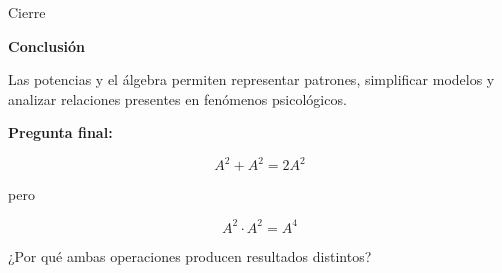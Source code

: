 \documentclass[handout,aspectratio=169]{beamer}
\begin{document}
	
	\begin{frame}{Cierre}
		\begin{center}
			{\Huge \textbf{Conclusión}}
			
			\vspace{0.5cm}
			
			\Large
			Las potencias y el álgebra permiten representar patrones, simplificar modelos y analizar relaciones presentes en fenómenos psicológicos.
			
			\vspace{0.7cm}
			
			\textbf{Pregunta final:}
			
			\[
			A^2+A^2=2A^2
			\]
			
			pero
			
			\[
			A^2\cdot A^2=A^4
			\]
			
			\vspace{0.4cm}
			
			¿Por qué ambas operaciones producen resultados distintos?
		\end{center}
	\end{frame}
	
\end{document}

